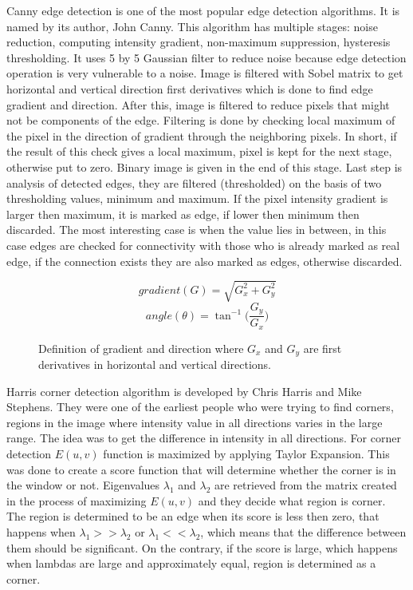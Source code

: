 \documentclass[../../../../main]{subfiles}
\begin{document}
Canny edge detection is one of the most popular edge detection algorithms. It is named by its author, John Canny. This algorithm has multiple stages: noise reduction, computing intensity gradient, non-maximum suppression, hysteresis thresholding. It uses 5 by 5 Gaussian filter to reduce noise because edge detection operation is very vulnerable to a noise. Image is filtered with Sobel matrix to get horizontal and vertical direction first derivatives which is done to find edge gradient and direction. After this, image is filtered to reduce pixels that might not be components of the edge. Filtering is done by checking local maximum of the pixel in the direction of gradient through the neighboring pixels. In short, if the result of this check gives a local maximum, pixel is kept for the next stage, otherwise put to zero. Binary image is given in the end of this stage. Last step is analysis of detected edges, they are filtered (thresholded) on the basis of two thresholding values, minimum and maximum. If the pixel intensity gradient is larger then maximum, it is marked as edge, if lower then minimum then discarded. The most interesting case is when the value lies in between, in this case edges are checked for connectivity with those who is already marked as real edge, if the connection exists they are also marked as edges, otherwise discarded.

\begin{figure} [!ht]
  \centering    
    \begin{equation}
        gradient(G) = \sqrt{G_x^2+G_y^2}
    \end{equation}
     \begin{equation}
        angle(\theta) = \tan^{-1}\bigg(\frac{G_y}{G_x}\bigg)
    \end{equation}
  \caption{Definition of gradient and direction where $G_x$ and $G_y$ are first derivatives in horizontal and vertical directions.}
\end{figure}

Harris corner detection algorithm is developed by Chris Harris and Mike Stephens. They were one of the earliest people who were trying to find corners, regions in the image where intensity value in all directions varies in the large range. The idea was to get the difference in intensity in all directions. For corner detection $E(u,v)$ function is maximized by applying Taylor Expansion. This was done to create a score function that will determine whether the corner is in the window or not. Eigenvalues $\lambda_1$ and $\lambda_2$ are retrieved from the matrix created in the process of maximizing $E(u,v)$ and they decide what region is corner. The region is determined to be an edge when its score is less then zero, that happens when $\lambda_1>>\lambda_2$ or $\lambda_1<<\lambda_2$, which means that the difference between them should be significant. On the contrary, if the score is large, which happens when lambdas are large and approximately equal, region is determined as a corner.
\end{document}
